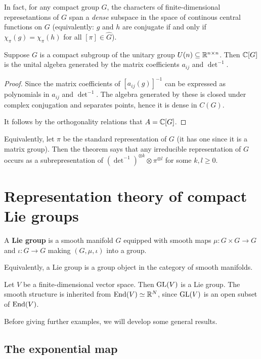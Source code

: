 \documentclass[11pt, english]{article}
\begin{document}
In fact, for any compact group $G$, the characters of finite-dimensional represetantions of $G$ span a \emph{dense} subspace in the space of continous central functions on $G$ (equivalently: $g$ and $h$ are conjugate if and only if $\chi_\pi(g) = \chi_\pi(h)$ for all $[\pi] \in \widehat G$).

\begin{thm}
 Suppose $G$ is a compact subgroup of the unitary group $U(n) \subseteq \mathbb{R}^{n\times n}$. Then $\mathbb{C}[G]$ is the unital algebra generated by the matrix coefficients $a_{ij}$ and $\det^{-1}$. 
\end{thm}

\begin{proof}
Since the matrix coefficients of $[a_{ij}(g)]^{-1}$ can be expressed as polynomials in $a_{ij}$ and $\det^{-1}$.  The algebra generated by these is closed under complex conjugation and separates points, hence it is dense in $C(G)$. 

It follows by the orthogonality relations that $A=\mathbb{C}[G]$. 
\end{proof}

Equivalently, let $\pi$ be the standard representation of $G$ (it has one since it is a matrix group). Then the theorem says that any irreducible representation of $G$ occurs as a subrepresentation of $(\det^{-1})^{\otimes k} \otimes \pi^{\otimes l}$ for some $k,l \geq 0$.

\newpage
\section{Representation theory of compact Lie groups}

A \textbf{Lie group} is a smooth manifold $G$ equipped with smooth maps $\mu:G \times G \to G$ and $\iota:G \to G$ making $(G,\mu,\iota)$ into a group.

Equivalently, a Lie group is a group object in the category of smooth manifolds.

\begin{example}
 Let $V$ be a finite-dimensional vector space. Then $\operatorname{GL}(V)$ is a Lie group. The smooth structure is inherited from $\operatorname{End}(V) \simeq \mathbb{R}^N$, since $\operatorname{GL}(V)$ is an open subset of $\operatorname{End}(V)$.
\end{example}

Before giving further examples, we will develop some general results.

\subsection{The exponential map}
\end{document}
